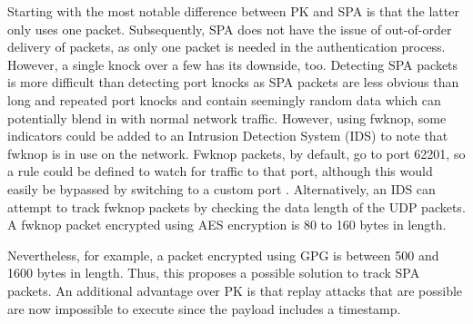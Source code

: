 Starting with the most notable difference between PK and SPA is that the latter only uses one packet. Subsequently, SPA does not have the issue of out-of-order delivery of packets, as only one packet is needed in the authentication process. However, a single knock over a few has its downside, too. Detecting SPA packets is more difficult than detecting port knocks as SPA packets are less obvious than long and repeated port knocks and contain seemingly random data which can potentially blend in with normal network traffic. However, using fwknop, some indicators could be added to an Intrusion Detection System (IDS) to note that fwknop is in use on the network.  Fwknop packets, by default, go to port 62201, so a rule could be defined to watch for traffic to that port, although this would easily be bypassed by switching to a custom port \cite{jeanquier}.  Alternatively, an IDS can attempt to track fwknop packets by checking the data length of the UDP packets.  A fwknop packet encrypted using AES encryption is 80 to 160 bytes in length.\par
Nevertheless, for example, a packet encrypted using GPG is between 500 and 1600 bytes in length.  Thus, this proposes a possible solution to track SPA packets. An additional advantage over PK is that replay attacks that are possible are now impossible to execute since the payload includes a timestamp.\\\par

